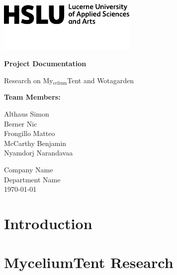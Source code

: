 \documentclass{article}
\begin{document}
\begin{titlepage}
    \begin{center}
        \vspace*{2cm}
        
        \includegraphics[width=0.5\textwidth]{media/hslu-svg-logo.png} %
        
        \vspace{1.5cm}
        
        {\Huge \textbf{Project Documentation}}
        
        \vspace{0.5cm}
        
        {\LARGE Research on My$_{\text{celium}}$Tent and Wotagarden}
        
        \vspace{2cm}
        
        {\large \textbf{Team Members:}}
        
        \vspace{0.5cm}
        
        {\Large
            Althaus Simon \\
            Berner Nic \\
            Frongillo Matteo \\
            McCarthy Benjamin \\
            Nyamdorj Narandavaa
        }
        
        \vfill
        
        {\large
            Company Name \\
            Department Name \\
            \today
        }
        
    \end{center}
\end{titlepage}

\tableofcontents
\thispagestyle{empty}
\newpage

\chapter{Introduction}

\chapter{MyceliumTent Research}
\end{document}
